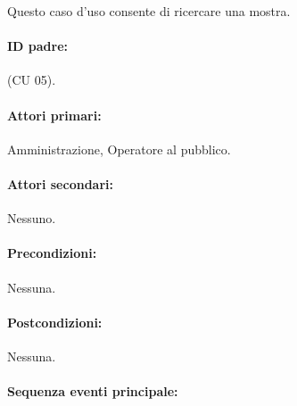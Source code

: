 \documentclass{article}
\begin{document}
	\indent\indent Questo caso d'uso consente di ricercare una mostra. 

	\paragraph{ID padre:}(CU 05).
	
	\paragraph{Attori primari:}Amministrazione, Operatore al pubblico.
	
	\paragraph{Attori secondari:}Nessuno.
	
	\paragraph{Precondizioni:}Nessuna.
	
	\paragraph{Postcondizioni:}Nessuna.
	
	\paragraph{Sequenza eventi principale:}
\end{document}
